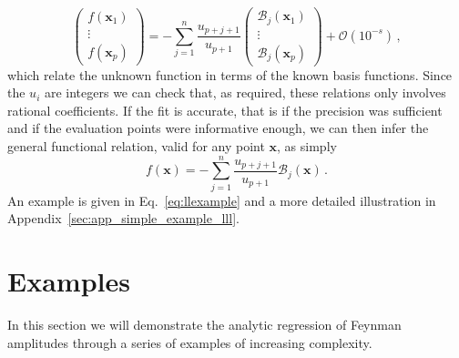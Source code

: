 \documentclass[a4paper,11pt]{article}
\begin{document}
\begin{equation}
 \begin{pmatrix}
        f(\mathbf{x}_1) \\
        \vdots\\
        f(\mathbf{x}_p) 
    \end{pmatrix} = -   \sum_{j=1}^{n} \frac{u_{p+j+1}}{u_{p+1}} \begin{pmatrix}
        \mathcal{B}_j(\mathbf{x}_1) \\
        \vdots\\
        \mathcal{B}_j(\mathbf{x}_p)
    \end{pmatrix} + \mathcal{O}(10^{-s})\,,
\end{equation}
    which relate the unknown function in terms of the known basis functions. Since the $u_i$ are integers we can check that, as required, these relations only involves rational coefficients. If the fit is accurate, that is if the precision was sufficient and if the evaluation points were informative enough, we can then infer the general functional relation, valid for any point $\mathbf{x}$, as simply
\begin{equation}
    f(\mathbf{x})= - \sum_{j=1}^{n} \frac{u_{p+j+1}}{u_{p+1}} \mathcal{B}_j(\mathbf{x}) \,.
\end{equation}
An example is given in Eq.~\eqref{eq:llexample} and a more detailed illustration in Appendix~\ref{sec:app_simple_example_lll}.

\section{Examples}\label{sec:simple_integrals}
In this section we will demonstrate the analytic regression of Feynman amplitudes through a series of examples of increasing complexity.
  
\end{document}
